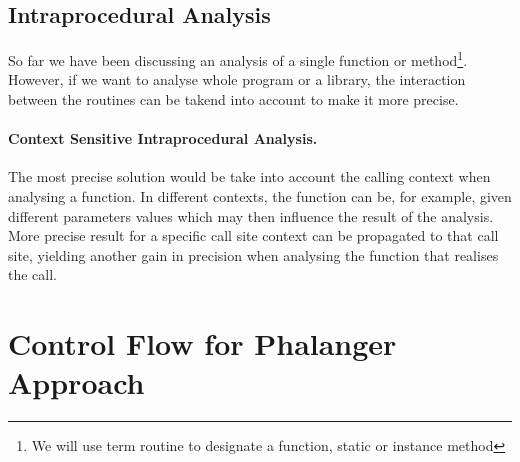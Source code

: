         \subsection{Intraprocedural Analysis}
        So far we have been discussing an analysis of a 
        single function or method\footnote{We will use term 
        routine to designate a function, static or instance method}. 
        However, if we want to analyse whole program or 
        a library, the interaction between the routines 
        can be takend into account to make it more precise.
        
        \paragraph{Context Sensitive Intraprocedural Analysis.}
        The most precise solution would be take into account 
        the calling context when analysing a function. 
        In different contexts, the function can be, 
        for example, given different parameters values 
        which may then influence the result of the analysis. 
        More precise result for a specific call site context 
        can be propagated to that call site, 
        yielding another gain in precision when 
        analysing the function that realises the call.
        
        \paragraph*{}
    
    \section{Control Flow for Phalanger Approach}
